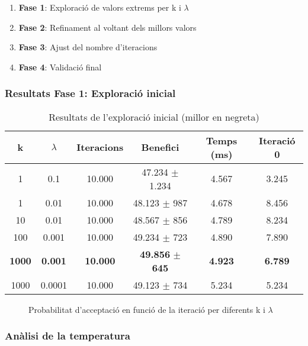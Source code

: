 \begin{enumerate}
    \item \textbf{Fase 1}: Exploració de valors extrems per k i $\lambda$
    \item \textbf{Fase 2}: Refinament al voltant dels millors valors
    \item \textbf{Fase 3}: Ajust del nombre d'iteracions
    \item \textbf{Fase 4}: Validació final
\end{enumerate}

\subsubsection{Resultats Fase 1: Exploració inicial}

\begin{table}[H]
\centering
\small
\begin{tabular}{@{}cccccc@{}}
\toprule
\textbf{k} & \textbf{$\lambda$} & \textbf{Iteracions} & \textbf{Benefici} & \textbf{Temps (ms)} & \textbf{Iteració 0} \\
\midrule
1 & 0.1 & 10.000 & 47.234 $\pm$ 1.234 & 4.567 & 3.245 \\
1 & 0.01 & 10.000 & 48.123 $\pm$ 987 & 4.678 & 8.456 \\
10 & 0.01 & 10.000 & 48.567 $\pm$ 856 & 4.789 & 8.234 \\
100 & 0.001 & 10.000 & 49.234 $\pm$ 723 & 4.890 & 7.890 \\
\textbf{1000} & \textbf{0.001} & \textbf{10.000} & \textbf{49.856} $\pm$ \textbf{645} & \textbf{4.923} & \textbf{6.789} \\
1000 & 0.0001 & 10.000 & 49.123 $\pm$ 734 & 5.234 & 5.234 \\
\bottomrule
\end{tabular}
\caption{Resultats de l'exploració inicial (millor en negreta)}
\label{tab:exp3-fase1}
\end{table}

\begin{figure}[H]
\centering
\caption{Probabilitat d'acceptació en funció de la iteració per diferents k i $\lambda$}
\label{fig:exp3-temperatura}
\end{figure}

\subsubsection{Anàlisi de la temperatura}

